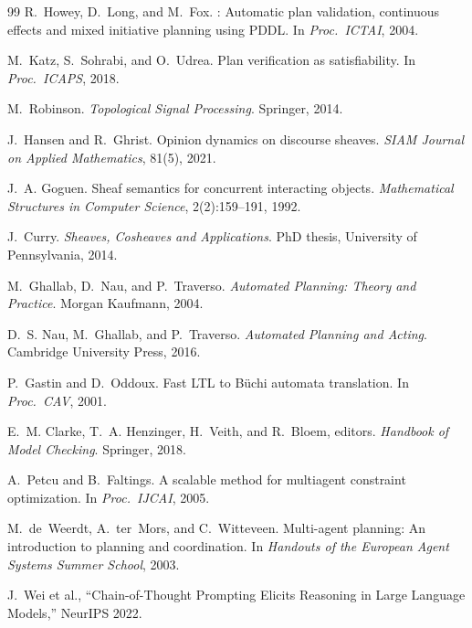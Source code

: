 \documentclass[11pt]{article}
\begin{document}
\begin{thebibliography}{99}
R.~Howey, D.~Long, and M.~Fox.
: Automatic plan validation, continuous effects and
  mixed initiative planning using {PDDL}.
\newblock In \emph{Proc.\ ICTAI}, 2004.

M.~Katz, S.~Sohrabi, and O.~Udrea.
\newblock Plan verification as satisfiability.
\newblock In \emph{Proc.\ ICAPS}, 2018.

M.~Robinson.
\newblock \emph{Topological Signal Processing}.
\newblock Springer, 2014.

J.~Hansen and R.~Ghrist.
\newblock Opinion dynamics on discourse sheaves.
\newblock \emph{SIAM Journal on Applied Mathematics}, 81(5), 2021.

J.~A. Goguen.
\newblock Sheaf semantics for concurrent interacting objects.
\newblock \emph{Mathematical Structures in Computer Science},
  2(2):159--191, 1992.

J.~Curry.
\newblock \emph{Sheaves, Cosheaves and Applications}.
\newblock PhD thesis, University of Pennsylvania, 2014.

M.~Ghallab, D.~Nau, and P.~Traverso.
\newblock \emph{Automated Planning: Theory and Practice}.
\newblock Morgan Kaufmann, 2004.

D.~S. Nau, M.~Ghallab, and P.~Traverso.
\newblock \emph{Automated Planning and Acting}.
\newblock Cambridge University Press, 2016.

P.~Gastin and D.~Oddoux.
\newblock Fast {LTL} to {B\"uchi} automata translation.
\newblock In \emph{Proc.\ CAV}, 2001.

E.~M. Clarke, T.~A. Henzinger, H.~Veith, and R.~Bloem, editors.
\newblock \emph{Handbook of Model Checking}.
\newblock Springer, 2018.

A.~Petcu and B.~Faltings.
\newblock A scalable method for multiagent constraint optimization.
\newblock In \emph{Proc.\ IJCAI}, 2005.

M.~de~Weerdt, A.~ter~Mors, and C.~Witteveen.
\newblock Multi-agent planning: An introduction to planning and
  coordination.
\newblock In \emph{Handouts of the European Agent Systems Summer
  School}, 2003.

J.~Wei et al., ``Chain-of-Thought Prompting Elicits Reasoning in
Large Language Models,'' NeurIPS 2022.


\end{thebibliography}
\end{document}
